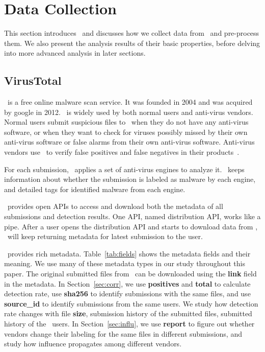 \section{Data Collection}
\label{sec:meth}

This section introduces \vt\ and 
discusses how we collect data from \vt\ and pre-process them.
We also present the analysis results of their basic properties, 
before delving into more advanced analysis in later sections.

\subsection{VirusTotal}

\vt\ is a free online malware scan service.
It was founded in 2004 and was acquired by google in 2012. 
\vt\ is widely used by both normal users and anti-virus vendors.
Normal users submit suspicious files to \vt\ when they do not have any anti-virus software, 
or when they want to check for viruses possibly missed by their own anti-virus software 
or false alarms from their own anti-virus software.  
Anti-virus vendors use \vt\ to verify false positives and false negatives in their products~\cite{huangvt2016bigdata, neeles}.

For each submission, \vt\ applies a set of anti-virus engines to analyze it. 
\vt\ keeps information about whether the submission is labeled as malware by each engine, 
and detailed tags for identified malware from each engine. 

\vt\ provides open APIs to access and download both the metadata of all submissions and detection results.
One API, named distribution API, works like a pipe.
After a user opens the distribution API and starts to download data from \vt, 
\vt\ will keep returning metadata for latest submission to the user. 

\vt\ provides rich metadata.
Table~\ref{tab:fields} shows the metadata fields and their meaning.  
We use many of these metadata types in our study throughout this paper.
The original submitted files from \vt\ can be downloaded using the {\bf link} field in the metadata.
{\color{red}In Section~\ref{sec:corr}, we use {\bf positives} and {\bf total} to calculate detection rate, 
use {\bf sha256} to identify submissions with the same files, 
and use {\bf source\_id} to identify submissions from the same users. 
We study how detection rate changes with file {\bf size}, 
submission history of the submitted files, 
submitted history of the \vt\ users. 
In Section~\ref{sec:influ}, we use {\bf report} to figure out whether vendors 
change their labeling for the same files in different submissions, 
and study how influence propagates among different vendors. }
\fi

